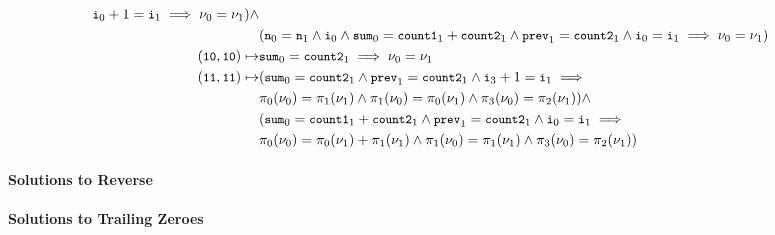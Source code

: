 \begin{align*}
  \cc{i}_0 + 1 = \cc{i}_1 \implies %
  \nu_0 = \nu_1) \land \\
  & (\cc{n}_0 = \cc{n}_1 \land \cc{i}_0 \land %
  \cc{sum}_0 = \cc{count1}_1 + \cc{count2}_1 \land %
  \cc{prev}_1 = \cc{count2}_1 \land %
  \cc{i}_0 = \cc{i}_1 \implies %
  \nu_0 = \nu_1) \\
  (\cc{10}, \cc{10}) \mapsto & \cc{sum}_0 = \cc{count2}_1 \implies %
  \nu_0 = \nu_1 \\
  (\cc{11}, \cc{11}) \mapsto & 
  (\cc{sum}_0 = \cc{count2}_1 \land %
  \cc{prev}_1 = \cc{count2}_1 \land %
  \cc{i}_3 + 1 = \cc{i}_1 \implies \\
  & \pi_0(\nu_0) = \pi_1(\nu_1) \land %
  \pi_1(\nu_0) = \pi_0(\nu_1) \land %
  \pi_3(\nu_0) = \pi_2(\nu_1)) \land \\
  & (\cc{sum}_0 = \cc{count1}_1 + \cc{count2}_1 \land %
  \cc{prev}_1 = \cc{count2}_1 \land %
  \cc{i}_0 = \cc{i}_1 \implies \\ %
  & \pi_0(\nu_0) = \pi_0(\nu_1) + \pi_1(\nu_1) \land %
  \pi_1(\nu_0) = \pi_1(\nu_1) \land %
  \pi_3(\nu_0) = \pi_2(\nu_1)) \\
\end{align*}
%
%


\paragraph{Solutions to Reverse}
%

\paragraph{Solutions to Trailing Zeroes}

